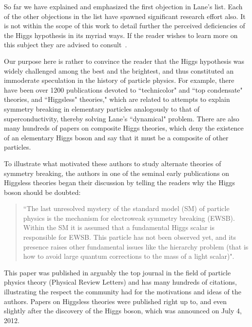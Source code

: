 \documentclass[letter,12pt]{article}
\begin{document}
So far we have explained and emphasized the first objection in Lane's list. Each of the other objections in the list have spawned
significant research effort also.
 It is not within the scope of this work to detail further the perceived deficiencies of the Higgs hypothesis in its myriad ways. If the reader wishes to learn more on this subject they are advised to consult~\cite{Wells:2009kq}. 

Our purpose here is rather to convince the reader that the Higgs hypothesis was widely challenged among the best and the brightest, and thus constituted an immoderate speculation in the history of particle physics.  For example, there have been over 1200 publications devoted to ``technicolor" and ``top condensate" theories, and ``Higgsless" theories," which are related to attempts to explain symmetry breaking in elementary particles analogously to that of superconductivity, thereby solving Lane's ``dynamical" problem. There are also many hundreds of papers on composite Higgs theories, which deny the existence of an elementary Higgs boson and say that it must be a composite of other particles.

To illustrate what motivated these authors to study alternate theories of symmetry breaking, the authors in one of the seminal early publications on Higgsless theories began their discussion by telling the readers why the Higgs boson should be doubted:
\begin{quote}
``The last unresolved mystery of the standard model (SM) of particle physics is the mechanism for electroweak symmetry breaking (EWSB). Within the SM it is assumed that a fundamental Higgs scalar is responsible for EWSB. This particle has not been observed yet, and its presence raises other fundamental issues like the hierarchy problem (that is how to avoid large quantum corrections to the mass of a light scalar)"\cite{Csaki:2003zu}. 
\end{quote}
This paper was published in arguably the top journal in the field of particle physics theory (Physical Review Letters) and has many hundreds of citations, illustrating the respect the community had for the motivations and ideas of the authors.  Papers on Higgsless theories were published right up to, and even slightly after 
the discovery of the Higgs boson, which was announced on July 4, 2012.
\end{document}

